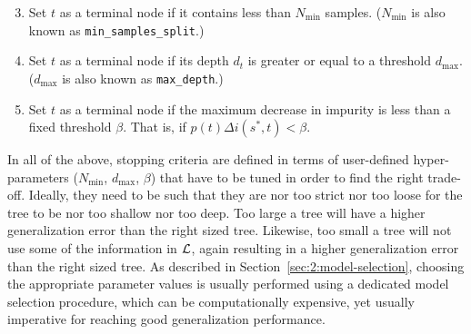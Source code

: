 \begin{enumerate}\setcounter{enumi}{2}

\item Set $t$ as a terminal node if it contains less than $N_\text{min}$ samples.
($N_\text{min}$ is also known as \texttt{min\_samples\_split}.)

\item Set $t$ as a terminal node if its depth $d_t$ is greater or equal to a threshold $d_\text{max}$.
($d_\text{max}$ is also known as \texttt{max\_depth}.)

\item Set $t$ as a terminal node if the maximum decrease in impurity is less than
a fixed threshold $\beta$. That is, if $p(t) \Delta i(s^*, t) < \beta$.

\end{enumerate}

In all of the above, stopping criteria are defined in terms of user-defined
hyper-parameters ($N_\text{min}$, $d_\text{max}$, $\beta$) that have to be
tuned in order to find the right trade-off. Ideally, they need to
be such that they are nor too strict nor too loose for the tree to be nor too
shallow nor too deep. Too large a tree will have a higher generalization error
than the right sized tree. Likewise, too small a tree will not use some of the
information in ${\cal L}$, again resulting in a higher generalization error
than the right sized tree. As described in Section~\ref{sec:2:model-selection},
choosing the appropriate parameter values is usually performed using a dedicated
model selection procedure, which can be computationally expensive, yet usually
imperative for reaching good generalization performance.

